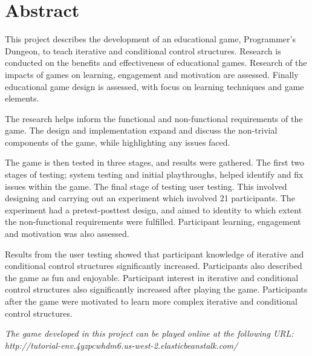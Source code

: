 \documentclass[a4paper,11.5pt]{report}
\numberwithin{figure}{section}
\numberwithin{table}{section}
\numberwithin{equation}{section}
\numberwithin{equation}{section}
\newcommand\blankpage{%
    \null
    \thispagestyle{empty}%
    \addtocounter{page}{-1}%
    \newpage}
\begin{document}
\afterpage{\blankpage}

\hfill

\section*{\Huge{Abstract}}


This project describes the development of an educational game, Programmer's Dungeon, to teach iterative and conditional control structures. Research is conducted on the benefits and effectiveness of educational games. Research of the impacts of games on learning, engagement and motivation are assessed. Finally educational game design is assessed, with focus on learning techniques and game elements. 

The research helps inform the functional and non-functional requirements of the game. The design and implementation expand and discuss the non-trivial components of the game, while highlighting any issues faced. 

The game is then tested in three stages, and results were gathered. The first two stages of testing; system testing and initial playthroughs, helped identify and fix issues within the game. The final stage of testing user testing. This involved designing and carrying out an experiment which involved 21 participants. The experiment had a pretest-posttest design, and aimed to identity to which extent the non-functional requirements were fulfilled. Participant learning, engagement and motivation was also assessed. 

Results from the user testing showed that participant knowledge of iterative and conditional control structures significantly increased. Participants also described the game as fun and enjoyable. Participant interest in iterative and conditional control structures also significantly increased after playing the game. Participants after the game were motivated to learn more complex iterative and conditional control structures. 

\textit{The game developed in this project can be played online at the following URL: http://tutorial-env.4yzpcwhdm6.us-west-2.elasticbeanstalk.com/}




\newpage

\tableofcontents

\newpage
{%
\let\oldnumberline\numberline%
\renewcommand{\numberline}{\figurename~\oldnumberline}%
\listoffigures%
}
\end{document}
